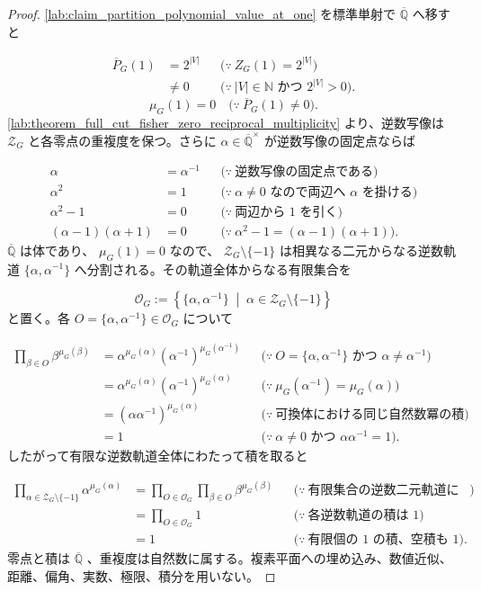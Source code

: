 \documentclass[11pt,a4paper]{article}
\theoremstyle{remark}
\begin{document}
\begin{proof}
\cref{lab:claim_partition_polynomial_value_at_one}
 を標準単射で 
$\overline{\mathbb Q}$
 へ移すと

\[\begin{aligned}
\overline P_G(1)
&=2^{|V|}
&&\bigl(\because\ Z_G(1)=2^{|V|}\bigr)\\
&\ne0
&&\bigl(\because\ |V|\in\mathbb N\text{ かつ }2^{|V|}>0\bigr).
\end{aligned}\]
\[\mu_G(1)=0
\quad\bigl(\because\ \overline P_G(1)\ne0\bigr).\]
\cref{lab:theorem_full_cut_fisher_zero_reciprocal_multiplicity}
 より、逆数写像は 
$\mathcal Z_G$
 と各零点の重複度を保つ。さらに 
$\alpha\in\overline{\mathbb Q}^{\times}$
 が逆数写像の固定点ならば

\[\begin{aligned}
\alpha
&=\alpha^{-1}
&&\bigl(\because\ \text{逆数写像の固定点である}\bigr)\\
\alpha^2
&=1
&&\bigl(\because\ \alpha\ne0\text{ なので両辺へ }\alpha\text{ を掛ける}\bigr)\\
\alpha^2-1
&=0
&&\bigl(\because\ \text{両辺から }1\text{ を引く}\bigr)\\
(\alpha-1)(\alpha+1)
&=0
&&\bigl(\because\ \alpha^2-1=(\alpha-1)(\alpha+1)\bigr).
\end{aligned}\]
$\overline{\mathbb Q}$
 は体であり、
$\mu_G(1)=0$
 なので、
$\mathcal Z_G\setminus\{-1\}$
 は相異なる二元からなる逆数軌道 
$\{\alpha,\alpha^{-1}\}$
 へ分割される。その軌道全体からなる有限集合を

\[\mathcal O_G:=
\left\{
  \{\alpha,\alpha^{-1}\}
  \;\middle|\;
  \alpha\in\mathcal Z_G\setminus\{-1\}
\right\}\]
と置く。各 
$O=\{\alpha,\alpha^{-1}\}\in\mathcal O_G$
 について

\[\begin{aligned}
\prod_{\beta\in O}\beta^{\mu_G(\beta)}
&=\alpha^{\mu_G(\alpha)}(\alpha^{-1})^{\mu_G(\alpha^{-1})}
&&\bigl(\because\ O=\{\alpha,\alpha^{-1}\}\text{ かつ }\alpha\ne\alpha^{-1}\bigr)\\
&=\alpha^{\mu_G(\alpha)}(\alpha^{-1})^{\mu_G(\alpha)}
&&\bigl(\because\ \mu_G(\alpha^{-1})=\mu_G(\alpha)\bigr)\\
&=(\alpha\alpha^{-1})^{\mu_G(\alpha)}
&&\bigl(\because\ \text{可換体における同じ自然数冪の積}\bigr)\\
&=1
&&\bigl(\because\ \alpha\ne0\text{ かつ }\alpha\alpha^{-1}=1\bigr).
\end{aligned}\]
したがって有限な逆数軌道全体にわたって積を取ると

\[\begin{aligned}
\prod_{\alpha\in\mathcal Z_G\setminus\{-1\}}\alpha^{\mu_G(\alpha)}
&=\prod_{O\in\mathcal O_G}\prod_{\beta\in O}\beta^{\mu_G(\beta)}
&&\bigl(\because\ \text{有限集合の逆数二元軌道による分割}\bigr)\\
&=\prod_{O\in\mathcal O_G}1
&&\bigl(\because\ \text{各逆数軌道の積は }1\bigr)\\
&=1
&&\bigl(\because\ \text{有限個の }1\text{ の積、空積も }1\bigr).
\end{aligned}\]
零点と積は 
$\overline{\mathbb Q}$
、重複度は自然数に属する。複素平面への埋め込み、数値近似、距離、偏角、実数、極限、積分を用いない。


\end{proof}
\end{document}
